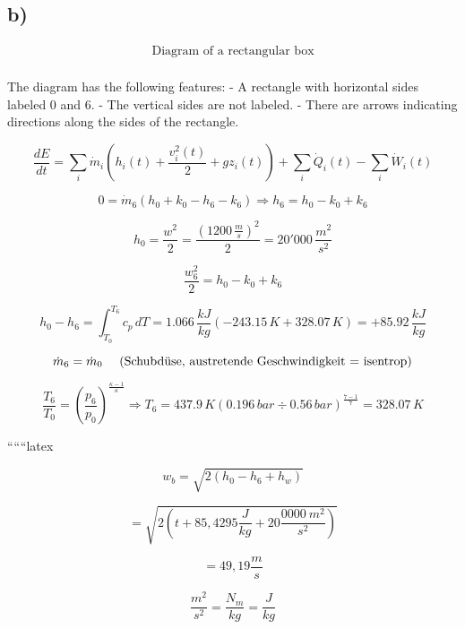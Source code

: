 

\subsection*{b)}

\[
\begin{array}{c}
\text{Diagram of a rectangular box} \\
\end{array}
\]

\noindent
The diagram has the following features:
- A rectangle with horizontal sides labeled 0 and 6.
- The vertical sides are not labeled.
- There are arrows indicating directions along the sides of the rectangle.

\[
\frac{dE}{dt} = \sum_{i} \dot{m}_i \left( h_i(t) + \frac{v_i^2(t)}{2} + gz_i(t) \right) + \sum_{i} \dot{Q}_i(t) - \sum_{i} \dot{W}_i(t)
\]

\[
0 = \dot{m}_6 (h_0 + k_0 - h_6 - k_6) \Rightarrow h_6 = h_0 - k_0 + k_6
\]

\[
h_0 = \frac{w^2}{2} = \frac{(1200 \, \frac{m}{s})^2}{2} = 20'000 \, \frac{m^2}{s^2}
\]

\[
\frac{w_6^2}{2} = h_0 - k_0 + k_6
\]

\[
h_0 - h_6 = \int_{T_0}^{T_6} c_p \, dT = 1.066 \, \frac{kJ}{kg} \left( -243.15 \, K + 328.07 \, K \right) = +85.92 \, \frac{kJ}{kg}
\]

\[
\dot{m}_6 = \dot{m}_0 \text{ \quad (Schubdüse, austretende Geschwindigkeit = isentrop)}
\]

\[
\frac{T_6}{T_0} = \left( \frac{p_6}{p_0} \right)^{\frac{\kappa - 1}{\kappa}} \Rightarrow T_6 = 437.9 \, K \left( 0.196 \, bar \div 0.56 \, bar \right)^{\frac{7-1}{7}} = 328.07 \, K
\]

``````latex


\[
w_{b} = \sqrt{2 \left( h_{0} - h_{6} + h_{w} \right)}
\]

\[
= \sqrt{2 \left( t + 85,4295 \frac{J}{kg} + 20 \frac{0000 \ m^2}{s^2} \right)}
\]

\[
= 49,19 \frac{m}{s}
\]

\[
\frac{m^2}{s^2} = \frac{N_m}{kg} = \frac{J}{kg}
\]